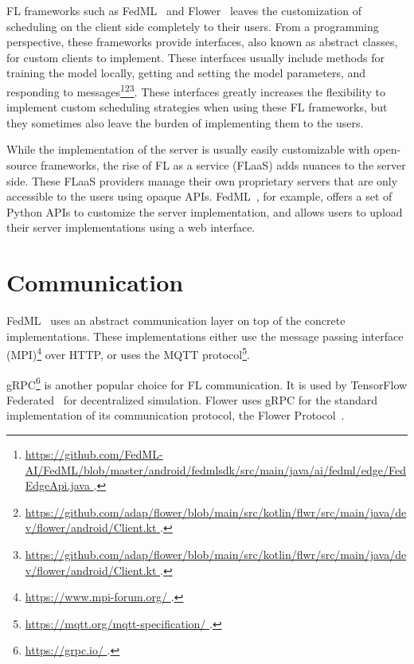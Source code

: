 \documentclass[conference]{IEEEtran}
\begin{document}
FL frameworks such as FedML~\cite{he2020fedml} and
Flower~\cite{beutel2020flower} leaves the customization of
scheduling on the client side completely to their users.
From a programming perspective,
these frameworks provide interfaces,
also known as abstract classes,
for custom clients to implement.
These interfaces usually include methods for
training the model locally,
getting and setting the model parameters,
and responding to messages\footnote{\url{
    https://github.com/FedML-AI/FedML/blob/master/android/fedmlsdk/src/main/java/ai/fedml/edge/FedEdgeApi.java
}.}\footnote{\url{
    https://github.com/adap/flower/blob/main/src/kotlin/flwr/src/main/java/dev/flower/android/Client.kt
}.}\footnote{\url{
    https://github.com/adap/flower/blob/main/src/kotlin/flwr/src/main/java/dev/flower/android/Client.kt
}.}.
These interfaces greatly increases the flexibility to
implement custom scheduling strategies when using these FL frameworks,
but they sometimes also leave the burden of implementing them to the users.

While the implementation of the server is usually easily customizable with
open-source frameworks,
the rise of FL as a service (FLaaS)
adds nuances to the server side.
These FLaaS providers manage their own proprietary servers that
are only accessible to the users using opaque APIs.
FedML~\cite{he2020fedml}, for example,
offers a set of Python APIs to customize the server implementation,
and allows users to upload their server implementations using a web interface.

\section{Communication}

FedML~\cite{he2020fedml} uses an abstract communication layer on top of
the concrete implementations.
These implementations either use the message passing interface
(MPI)\footnote{\url{
    https://www.mpi-forum.org/
}.} over HTTP,
or uses the MQTT protocol\footnote{\url{
    https://mqtt.org/mqtt-specification/
}.}.

gRPC\footnote{\url{
    https://grpc.io/
}.} is another popular choice for FL communication.
It is used by TensorFlow Federated~\cite{tff} for decentralized simulation.
Flower uses gRPC for the standard implementation of
its communication protocol, the Flower Protocol~\cite{beutel2020flower}.
\end{document}
